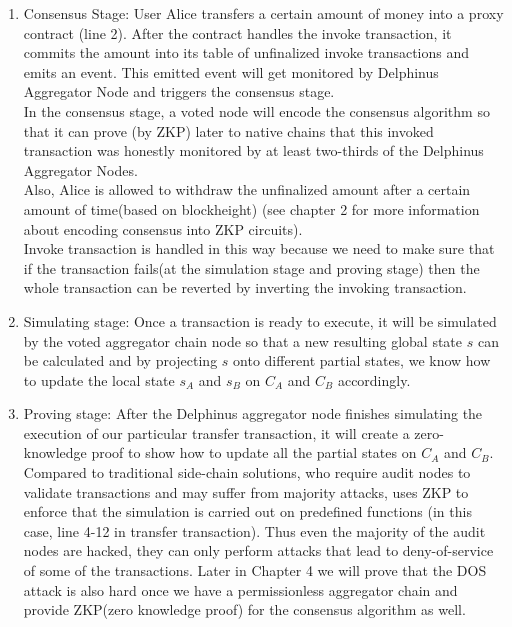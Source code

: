 \documentclass[pageno]{jpaper}
\begin{document}
\begin{enumerate}[leftmargin=*]
\item Consensus Stage:
User Alice transfers a certain amount of money into a proxy contract (line 2). After the contract handles the invoke transaction, it commits the amount into its table of unfinalized invoke transactions and emits an event. This emitted event will get monitored by Delphinus Aggregator Node and triggers the consensus stage.\\
\newline
In the consensus stage, a voted node will encode the consensus algorithm so that it can prove (by ZKP) later to native chains that this invoked transaction was honestly monitored by at least two-thirds of the Delphinus Aggregator Nodes. \\
\newline
Also, Alice is allowed to withdraw the unfinalized amount after a certain amount of time(based on blockheight) (see chapter 2 for more information about encoding consensus into ZKP circuits).\\
\newline
Invoke transaction is handled in this way because we need to make sure that if the transaction fails(at the simulation stage and proving stage) then the whole transaction can be reverted by inverting the invoking transaction.\\
\item Simulating stage:
Once a transaction is ready to execute, it will be simulated by the voted aggregator chain node so that a new resulting global state $s$ can be calculated and by projecting $s$ onto different partial states, we know how to update the local state $s_A$ and $s_B$ on $C_A$ and $C_B$ accordingly.\\
\item Proving stage:
After the Delphinus aggregator node finishes simulating the execution of our particular transfer transaction, it will create a zero-knowledge proof to show how to update all the partial states on $C_A$  and $C_B$.\\
\newline
Compared to traditional side-chain solutions, who require audit nodes to validate transactions and may suffer from majority attacks, \dprotocol uses ZKP to enforce that the simulation is carried out on predefined functions (in this case, line 4-12 in transfer transaction). Thus even the majority of the audit nodes are hacked, they can only perform attacks that lead to deny-of-service of some of the transactions. Later in Chapter 4 we will prove that the DOS attack is also hard once we have a permissionless aggregator chain and provide ZKP(zero knowledge proof) for the consensus algorithm as well.\\ 

\end{enumerate}
\end{document}
